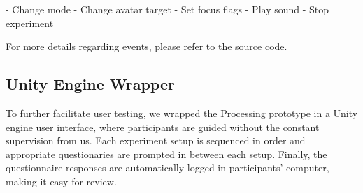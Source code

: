 - Change mode
- Change avatar target
- Set focus flags
- Play sound
- Stop experiment

For more details regarding events, please refer to the source code.

\subsection{Unity Engine Wrapper}

To further facilitate user testing, we wrapped the Processing prototype in a Unity engine user interface, where participants are guided without the constant supervision from us. Each experiment setup is sequenced in order and appropriate questionaries are prompted in between each setup. Finally, the questionnaire responses are automatically logged in participants’ computer, making it easy for review.
